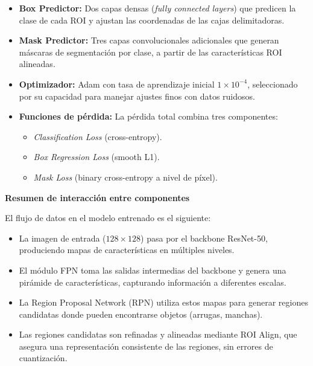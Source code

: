 \begin{enumerate}
\begin{itemize}
\begin{itemize}
    \item \textbf{Box Predictor:} Dos capas densas (\textit{fully connected layers}) que predicen la clase de cada ROI y ajustan las coordenadas de las cajas delimitadoras.
    
    \item \textbf{Mask Predictor:} Tres capas convolucionales adicionales que generan máscaras de segmentación por clase, a partir de las características ROI alineadas.
    
    \item \textbf{Optimizador:} Adam con tasa de aprendizaje inicial $1 \times 10^{-4}$, seleccionado por su capacidad para manejar ajustes finos con datos ruidosos.
    
    \item \textbf{Funciones de pérdida:} La pérdida total combina tres componentes: 
    \begin{itemize}
        \item \textit{Classification Loss} (cross-entropy).
        \item \textit{Box Regression Loss} (smooth L1).
        \item \textit{Mask Loss} (binary cross-entropy a nivel de píxel).
    \end{itemize}
\end{itemize}

\vspace{0.5cm}

\textbf{Resumen de interacción entre componentes}

El flujo de datos en el modelo entrenado es el siguiente:

\begin{itemize}
    \item La imagen de entrada ($128 \times 128$) pasa por el backbone ResNet-50, produciendo mapas de características en múltiples niveles.
    
    \item El módulo FPN toma las salidas intermedias del backbone y genera una pirámide de características, capturando información a diferentes escalas.
    
    \item La Region Proposal Network (RPN) utiliza estos mapas para generar regiones candidatas donde pueden encontrarse objetos (arrugas, manchas).
    
    \item Las regiones candidatas son refinadas y alineadas mediante ROI Align, que asegura una representación consistente de las regiones, sin errores de cuantización.
    

\end{itemize}
\end{itemize}
\end{enumerate}

